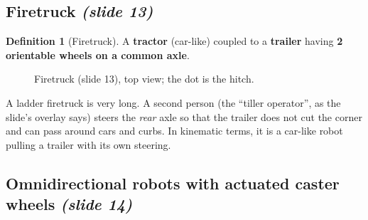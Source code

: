 \documentclass[11pt,a4paper]{article}
\theoremstyle{definition}
\newtheorem{definition}{Definition}[section]
\theoremstyle{plain}
\newcommand{\fixedwheel}[2]{\begin{scope}[shift={(#1)},rotate=#2]
  \draw[fill=gray!30] (-0.3,-0.07) rectangle (0.3,0.07);\end{scope}}
\newcommand{\orientwheel}[2]{\begin{scope}[shift={(#1)},rotate=#2]
  \draw[pattern=north east lines] (-0.3,-0.07) rectangle (0.3,0.07);
  \fill (0,0) circle (1pt);\end{scope}}
\begin{document}
\subsection{Firetruck \emph{(slide 13)}}

\begin{definition}[Firetruck]
A \textbf{tractor} (car-like) coupled to a \textbf{trailer} having \textbf{2 orientable wheels on a common axle}.
\end{definition}

\begin{figure}[H]
\centering
{}
\caption{Firetruck (slide 13), top view; the dot is the hitch.}
\end{figure}

\begin{intuition}
A ladder firetruck is very long. A second person (the ``tiller operator'', as the slide's overlay says) steers the \emph{rear} axle so that the trailer does not cut the corner and can pass around cars and curbs. In kinematic terms, it is a car-like robot pulling a trailer with its own steering.
\end{intuition}

\subsection{Omnidirectional robots with actuated caster wheels \emph{(slide 14)}}
\end{document}
